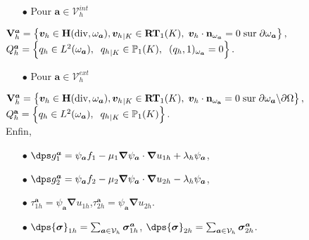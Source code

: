 \documentclass{beamer}
\renewcommand{\div}{\mathrm{div}}
\begin{document}
\begin{frame}
\begin{itemize}
\item[$\bullet$]Pour ${\bm a} \in {\mathcal{V}}_h^{int}$
\end{itemize}
${\bf V}_h^{\bm a}=\left\{{\bm v}_h \in \textbf H(\div,\omega_{\bm a}), {{\bm v}_h}_{|K}\in \textbf{RT}_1(K), \hspace{0.1 cm} {\bm v}_h\cdot {\bf n}_{\omega_{\bm a}}=0 \hspace{0.1 cm} \mbox{sur} \hspace{0.1 cm} \partial \omega_{\bm a} \right\},$\\
$Q_h^{\bm a}=\left\{q_h \in L^2(\omega_{\bm a}),\hspace{0.2 cm} {q_h}_{|K} \in {\mathbb{P}}_1(K),\hspace{0.2 cm} (q_h,1)_{\omega_{\bm a}}=0\right\}.$
\\
\begin{itemize}
\item[$\bullet$]Pour ${\bm a} \in {\mathcal{V}}_h^{ext}$
\end{itemize}
${\bf V}_h^{\bm a}=\left\{{\bm v}_h \in \textbf H(\div,\omega_{\bm a}), {{\bm v}_h}_{|K}\in \textbf{RT}_1(K),\hspace{0.1 cm} {\bm v}_h\cdot {\bf n_{\omega_{\bm a}}}=0 \hspace{0.1 cm} \mbox{sur} \hspace{0.1 cm} \partial \omega_{\bm a}\backslash \partial\Omega\right\},$\\
$Q_h^{\bf a}=\left\{q_h \in L^2(\omega_{\bm a}), \hspace{0.2 cm} {q_h}_{|K} \in {\mathbb{P}}_1(K) \right\}.$
\\
Enfin,
\begin{itemize}
\item[$\bullet$] $\dps g_{\mathrm{1}}^{\bm a}=\psi_{\bm a} f_1-\mu_1 {\bm \nabla} \psi_{\bm a} \cdot {\bm \nabla}  {u_{1h}}+\lambda_h \psi_{\bm a}$, 
\label{eq: fonction_ g_1^a}
\\
\item[$\bullet$] $\dps g_{\mathrm{2}}^{\bm a} = \psi_{\bm a} f_2-\mu_2 {\bm \nabla} \psi_{\bm a} \cdot {\bm \nabla}  u_{2h}-\lambda_h \psi_{\bm a}$,
\label{eq: fonction_g_2^a}\\
\item[$\bullet$] ${\bm{\mathcal{\tau}}}_{1h}^{\bm a}= \psi_{\bm a} {\bm \nabla} u_{1h}$,\quad ${\bm{\mathcal{\tau}}}_{2h}^{\bm a}= \psi_{\bm a} {\bm \nabla} u_{2h}$.\\
\item[$\bullet$] $\dps {\bm{\sigma}}_{1h}=\sum_{{\bm a}\in {\mathcal{V}}_h} {\bm{\sigma}}_{1h}^{\bm a}$, \quad  $\dps {\bm {\sigma}}_{2h}= \sum_{{\bm a}\in {\mathcal{V}}_h} {\bm{\sigma}}_{2h}^{\bm a}$. 
\label{ref: fonction_sigma2h}
\end{itemize}
\end{frame}
\end{document}
